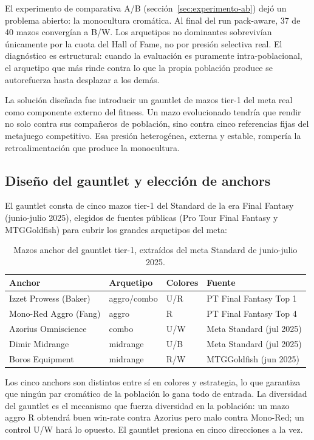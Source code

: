 El experimento de comparativa A/B (sección~\ref{sec:experimento-ab}) dejó un problema abierto: la monocultura cromática. Al final del run pack-aware, 37 de 40 mazos convergían a B/W. Los arquetipos no dominantes sobrevivían únicamente por la cuota del Hall of Fame, no por presión selectiva real. El diagnóstico es estructural: cuando la evaluación es puramente intra-poblacional, el arquetipo que más rinde contra lo que la propia población produce se autorefuerza hasta desplazar a los demás.

La solución diseñada fue introducir un gauntlet de mazos tier-1 del meta real como componente externo del fitness. Un mazo evolucionado tendría que rendir no solo contra sus compañeros de población, sino contra cinco referencias fijas del metajuego competitivo. Esa presión heterogénea, externa y estable, rompería la retroalimentación que produce la monocultura.

\subsection{Diseño del gauntlet y elección de anchors}

El gauntlet consta de cinco mazos tier-1 del Standard de la era Final Fantasy (junio-julio 2025), elegidos de fuentes públicas (Pro Tour Final Fantasy y MTGGoldfish) para cubrir los grandes arquetipos del meta:

\begin{table}[H]
\centering
\caption{Mazos anchor del gauntlet tier-1, extraídos del meta Standard de junio-julio 2025.}
\label{tab:gauntlet-anchors}
\begin{tabular}{llll}
\toprule
\textbf{Anchor} & \textbf{Arquetipo} & \textbf{Colores} & \textbf{Fuente} \\
\midrule
Izzet Prowess (Baker)   & aggro/combo & U/R & PT Final Fantasy Top 1 \\
Mono-Red Aggro (Fang)   & aggro       & R   & PT Final Fantasy Top 4 \\
Azorius Omniscience     & combo       & U/W & Meta Standard (jul 2025) \\
Dimir Midrange          & midrange    & U/B & Meta Standard (jul 2025) \\
Boros Equipment         & midrange    & R/W & MTGGoldfish (jun 2025) \\
\bottomrule
\end{tabular}
\end{table}

Los cinco anchors son distintos entre sí en colores y estrategia, lo que garantiza que ningún par cromático de la población lo gana todo de entrada. La diversidad del gauntlet es el mecanismo que fuerza diversidad en la población: un mazo aggro R obtendrá buen win-rate contra Azorius pero malo contra Mono-Red; un control U/W hará lo opuesto. El gauntlet presiona en cinco direcciones a la vez.

